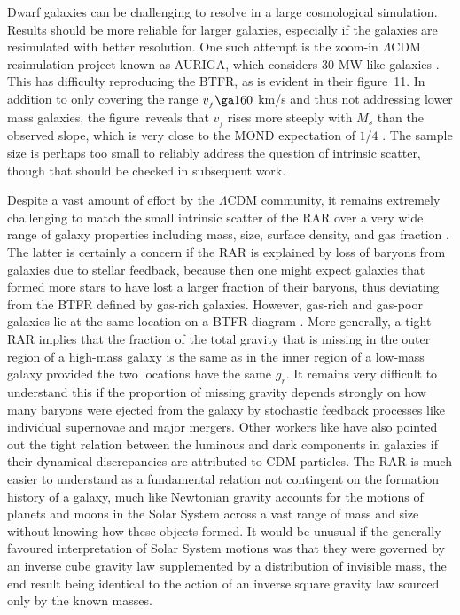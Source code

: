 \documentclass[fleqn,usenatbib,useAMS]{mnras} %
\begin{document}
Dwarf galaxies can be challenging to resolve in a large cosmological simulation. Results should be more reliable for larger galaxies, especially if the galaxies are resimulated with better resolution. One such attempt is the zoom-in $\Lambda$CDM resimulation project known as AURIGA, which considers 30 MW-like galaxies \citep{Grand_2017}. This has difficulty reproducing the BTFR, as is evident in their figure~11. In addition to only covering the range $v_{_f} \ga 160$ km/s and thus not addressing lower mass galaxies, the figure~reveals that $v_{_f}$ rises more steeply with $M_s$ than the observed slope, which is very close to the MOND expectation of $1/4$ \citep{McGaugh_2015}. The sample size is perhaps too small to reliably address the question of intrinsic scatter, though that should be checked in subsequent work.

Despite a vast amount of effort by the $\Lambda$CDM community, it remains extremely challenging to match the small intrinsic scatter of the RAR over a very wide range of galaxy properties including mass, size, surface density, and gas fraction \citep[figure~4 of][]{Lelli_2017}. The latter is certainly a concern if the RAR is explained by loss of baryons from galaxies due to stellar feedback, because then one might expect galaxies that formed more stars to have lost a larger fraction of their baryons, thus deviating from the BTFR defined by gas-rich galaxies. However, gas-rich and gas-poor galaxies lie at the same location on a BTFR diagram \citep[see e.g. figure~3 of][]{Famaey_McGaugh_2012}. More generally, a tight RAR implies that the fraction of the total gravity that is missing in the outer region of a high-mass galaxy is the same as in the inner region of a low-mass galaxy provided the two locations have the same $g_r$. It remains very difficult to understand this if the proportion of missing gravity depends strongly on how many baryons were ejected from the galaxy by stochastic feedback processes like individual supernovae and major mergers. Other workers like \citet{Salucci_2019} have also pointed out the tight relation between the luminous and dark components in galaxies if their dynamical discrepancies are attributed to CDM particles. The RAR is much easier to understand as a fundamental relation not contingent on the formation history of a galaxy, much like Newtonian gravity accounts for the motions of planets and moons in the Solar System across a vast range of mass and size without knowing how these objects formed. It would be unusual if the generally favoured interpretation of Solar System motions was that they were governed by an inverse cube gravity law supplemented by a distribution of invisible mass, the end result being identical to the action of an inverse square gravity law sourced only by the known masses.
\end{document}
